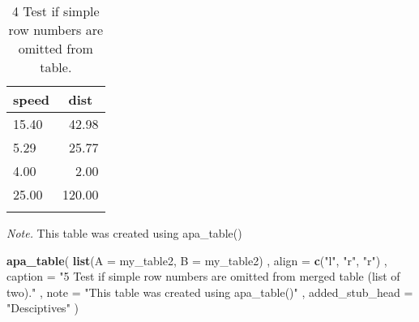 \documentclass[english,man]{apa6}
\newenvironment{Shaded}{\begin{snugshade}}{\end{snugshade}}
\newcommand{\DataTypeTok}[1]{\textcolor[rgb]{0.13,0.29,0.53}{#1}}
\newcommand{\KeywordTok}[1]{\textcolor[rgb]{0.13,0.29,0.53}{\textbf{#1}}}
\newcommand{\NormalTok}[1]{#1}
\newcommand{\StringTok}[1]{\textcolor[rgb]{0.31,0.60,0.02}{#1}}
\begin{document}
\begin{table}[tbp]

\begin{center}
\begin{threeparttable}

\caption{\label{tab:unnamed-chunk-8}4 Test if simple row numbers are omitted from table.}

\begin{tabular}{lr}
\toprule
speed & \multicolumn{1}{c}{dist}\\
\midrule
15.40 & 42.98\\
5.29 & 25.77\\
4.00 & 2.00\\
25.00 & 120.00\\
\bottomrule
\addlinespace
\end{tabular}

\begin{tablenotes}[para]
\normalsize{\textit{Note.} This table was created using apa\_table()}
\end{tablenotes}

\end{threeparttable}
\end{center}

\end{table}

\begin{Shaded}
\begin{Highlighting}[]
\KeywordTok{apa_table}\NormalTok{(}
  \KeywordTok{list}\NormalTok{(}\DataTypeTok{A =}\NormalTok{ my_table2, }\DataTypeTok{B =}\NormalTok{ my_table2)}
\NormalTok{  , }\DataTypeTok{align =} \KeywordTok{c}\NormalTok{(}\StringTok{"l"}\NormalTok{, }\StringTok{"r"}\NormalTok{, }\StringTok{"r"}\NormalTok{)}
\NormalTok{  , }\DataTypeTok{caption =} \StringTok{"5 Test if simple row numbers are omitted from merged table (list of two)."}
\NormalTok{  , }\DataTypeTok{note =} \StringTok{"This table was created using apa_table()"}
\NormalTok{  , }\DataTypeTok{added_stub_head =} \StringTok{"Desciptives"}
\NormalTok{)}
\end{Highlighting}
\end{Shaded}
\end{document}
